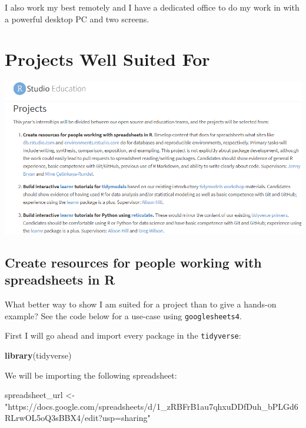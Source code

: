 \documentclass[
]{book}
\newenvironment{Shaded}{\begin{snugshade}}{\end{snugshade}}
\newcommand{\KeywordTok}[1]{\textcolor[rgb]{0.13,0.29,0.53}{\textbf{#1}}}
\newcommand{\NormalTok}[1]{#1}
\newcommand{\StringTok}[1]{\textcolor[rgb]{0.31,0.60,0.02}{#1}}
\begin{document}
I also work my best remotely and I have a dedicated office to do my work in with a powerful desktop PC and two screens.

\hypertarget{ideal-projects}{%
\chapter{Projects Well Suited For}\label{ideal-projects}}

\includegraphics{images/projects_list.png}

\hypertarget{create-resources-for-people-working-with-spreadsheets-in-r}{%
\section{Create resources for people working with spreadsheets in R}\label{create-resources-for-people-working-with-spreadsheets-in-r}}

What better way to show I am suited for a project than to give a hands-on example? See the code below for a use-case using \texttt{googlesheets4}\citep{R-googlesheets4}.

First I will go ahead and import every package in the \texttt{tidyverse}\citep{R-tidyverse}:

\begin{Shaded}
\begin{Highlighting}[]
\KeywordTok{library}\NormalTok{(tidyverse)}
\end{Highlighting}
\end{Shaded}

We will be importing the following spreadsheet:

\begin{Shaded}
\begin{Highlighting}[]
\NormalTok{spreadsheet_url <-}\StringTok{ "https://docs.google.com/spreadsheets/d/1_zRBFrB1au7qhxuDDfDuh_bPLGd6RLrwOL5oQ3sBBX4/edit?usp=sharing"}
\end{Highlighting}
\end{Shaded}
\end{document}
